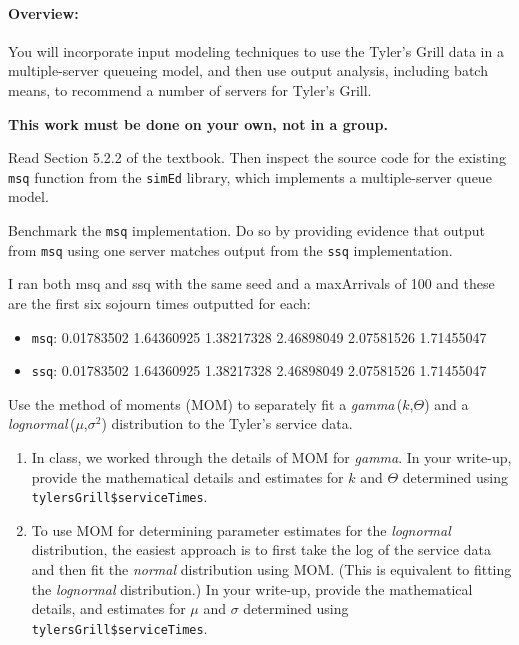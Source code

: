 \documentclass[11pt,addpoints,answers]{exam}
\begin{document}
\noindent
\paragraph{Overview:} You will incorporate input modeling techniques to use the
Tyler's Grill data in a multiple-server queueing model, and then use output
analysis, including batch means, to recommend a number of servers for Tyler's
Grill.

\vspace*{6pt}
\centerline{\textbf{This work must be done on your own, not in a group.}}

\begin{questions}
  \question Read Section 5.2.2 of the textbook. 
  Then inspect the source code for the existing {\tt msq} function from the
  {\tt simEd} library, which implements a multiple-server queue model.

  Benchmark the {\tt msq} implementation.  
  Do so by providing evidence that output from {\tt msq} 
  using one server matches output from the {\tt ssq} implementation.
  \begin{solution}
    I ran both msq and ssq with the same seed and a maxArrivals of 100 and
    these are the first six sojourn times outputted for each:
    \begin{itemize}
      \item {\tt msq}: 0.01783502 1.64360925 1.38217328 2.46898049 2.07581526
        1.71455047
      \item {\tt ssq}: 0.01783502 1.64360925 1.38217328 2.46898049 2.07581526
        1.71455047
    \end{itemize}
  \end{solution}
     
  \question Use the method of moments (MOM) to separately fit a {\it gamma}\,($k$,$\Theta$)
  and a {\it lognormal}\,($\mu$,$\sigma^2$) distribution to the Tyler's service data.
  \begin{enumerate}
      
    \item In class, we worked through the details of MOM for {\it gamma}.
      In your write-up, provide the mathematical details and estimates
      for $k$ and $\Theta$ determined using {\tt tylersGrill\$serviceTimes}.
      \begin{solution}
      \end{solution}
      
    \item To use MOM for determining parameter estimates for the {\it lognormal}
      distribution, the easiest approach is to first take the log of the
      service data and then fit the {\it normal} distribution using MOM.
      (This is equivalent to fitting the {\it lognormal} distribution.)
      In your write-up, provide the mathematical details, and estimates
      for $\mu$ and $\sigma$ determined using {\tt tylersGrill\$serviceTimes}.
      \begin{solution}
      \end{solution}
      

\end{enumerate}
\end{questions}
\end{document}
